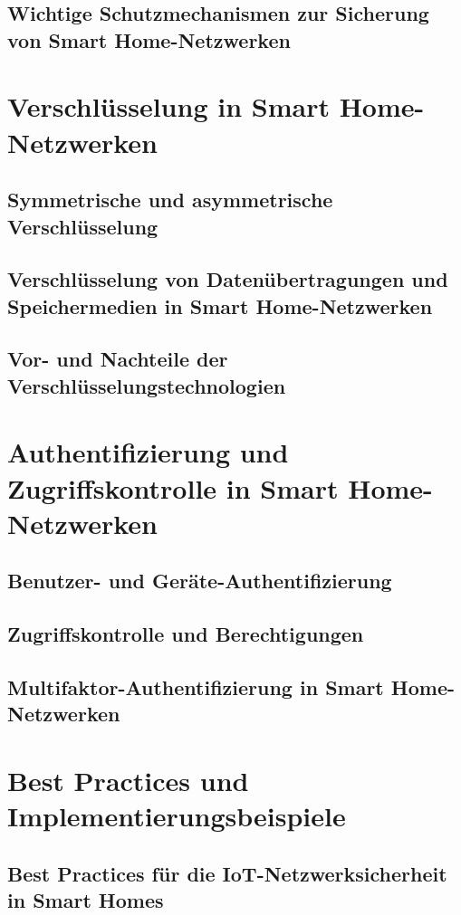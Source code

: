 \subsection{Wichtige Schutzmechanismen zur Sicherung von Smart Home-Netzwerken}

\newpage
\section{Verschlüsselung in Smart Home-Netzwerken}

\subsection{Symmetrische und asymmetrische Verschlüsselung}
\subsection{Verschlüsselung von Datenübertragungen und Speichermedien in Smart Home-Netzwerken}
\subsection{Vor- und Nachteile der Verschlüsselungstechnologien}

\newpage
\section{Authentifizierung und Zugriffskontrolle in Smart Home-Netzwerken}

\subsection{Benutzer- und Geräte-Authentifizierung}
\subsection{Zugriffskontrolle und Berechtigungen}
\subsection{Multifaktor-Authentifizierung in Smart Home-Netzwerken}

\newpage
\section{Best Practices und Implementierungsbeispiele}

\subsection{Best Practices für die IoT-Netzwerksicherheit in Smart Homes}
